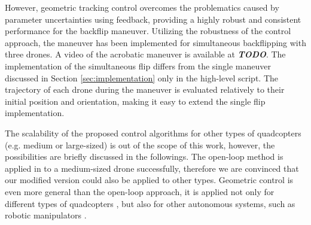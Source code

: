 However, geometric tracking control overcomes the problematics caused by parameter uncertainties using feedback, providing a highly robust and consistent performance for the backflip maneuver. Utilizing the robustness of the control approach, the maneuver has been implemented for simultaneous backflipping with three drones. A video of the acrobatic maneuver is available at \textbf{\textit{TODO}}. The implementation of the simultaneous flip differs from the single maneuver discussed in Section \ref{sec:implementation} only in the high-level script. The trajectory of each drone during the maneuver is evaluated relatively to their initial position and orientation, making it easy to extend the single flip implementation. %

The scalability of the proposed control algorithms for other types of quadcopters (e.g. medium or large-sized) is out of the scope of this work, however, the possibilities are briefly discussed in the followings. The open-loop method is applied in \cite{LSICRA2010} to a medium-sized drone successfully, therefore we are convinced that our modified version could also be applied to other types. Geometric control is even more general than the open-loop approach, it is applied not only for different types of quadcopters \cite{turpinkumar2011}, but also for other autonomous systems, such as robotic manipulators \cite{bullo2004}.